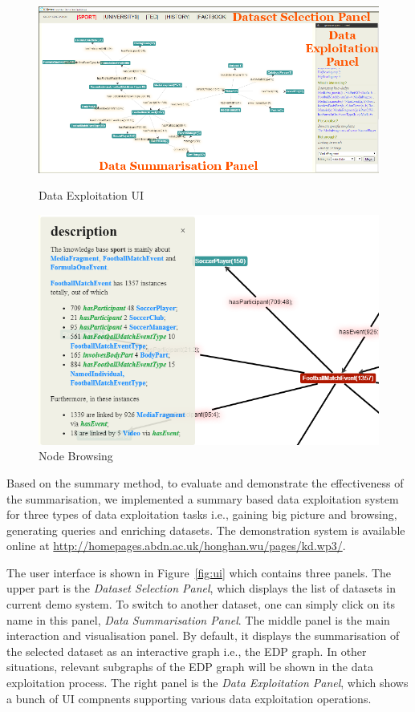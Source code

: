 
\begin{figure}
  \includegraphics[scale=0.30, trim=12mm 1mm 5cm 1cm]{figures/ui_general_annotated.png}
 \caption{Data Exploitation UI}\label{fig:ui}
\endminipage\hfill
{}
  \includegraphics[scale=0.30]{figures/node.png}
  \caption{Node Browsing}\label{fig:node}
\endminipage
\end{figure}

Based on the summary method, to evaluate and demonstrate the effectiveness of the summarisation, we implemented a summary based data exploitation system for three types of data exploitation tasks i.e., gaining big picture and browsing, generating queries and enriching datasets. The demonstration system is available online at \url{http://homepages.abdn.ac.uk/honghan.wu/pages/kd.wp3/}.

The user interface is shown in Figure~\ref{fig:ui} which contains three panels. The upper part is the \emph{Dataset Selection Panel}, which displays the list of datasets in current demo system. To switch to another dataset, one can simply click on its name in this panel, \emph{Data Summarisation Panel}. The middle panel is the main interaction and visualisation panel. By default, it displays the summarisation of the selected dataset as an interactive graph i.e., the EDP graph. In other situations, relevant subgraphs of the EDP graph will be shown in the data exploitation process. The right panel is the \emph{Data Exploitation Panel}, which shows a bunch of UI compnents supporting various data exploitation operations.

